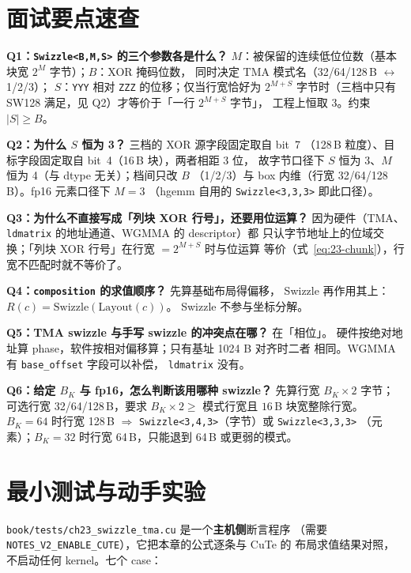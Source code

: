 \section{面试要点速查}

\textbf{Q1：\texttt{Swizzle\allowbreak{}<B,\allowbreak{}M,\allowbreak{}S>} 的三个参数各是什么？}
$M$：被保留的连续低位位数（基本块宽 $2^M$ 字节）；$B$：XOR 掩码位数，
同时决定 TMA 模式名（32/64/128\,B $\leftrightarrow$ 1/2/3）；
$S$：\texttt{YYY} 相对 \texttt{ZZZ} 的位移；仅当行宽恰好为 $2^{M+S}$
字节时（三档中只有 SW128 满足，见 Q2）才等价于「一行 $2^{M+S}$ 字节」，
工程上恒取 3。约束 $|S|\ge B$。

\textbf{Q2：为什么 $S$ 恒为 3？} 三档的 XOR 源字段固定取自 bit~7
（128\,B 粒度）、目标字段固定取自 bit~4（16\,B 块），两者相距 3 位，
故字节口径下 $S$ 恒为 3、$M$ 恒为 4（与 dtype 无关）；档间只改 $B$
（1/2/3）与 box 内维（行宽 32/64/128\,B）。fp16 元素口径下 $M=3$
（hgemm 自用的 \texttt{Swizzle\allowbreak{}<3,\allowbreak{}3,\allowbreak{}3>} 即此口径）。

\textbf{Q3：为什么不直接写成「列块 XOR 行号」，还要用位运算？}
因为硬件（TMA、\texttt{ldmatrix} 的地址通道、WGMMA 的 descriptor）都
只认字节地址上的位域交换；「列块 XOR 行号」在行宽 $=2^{M+S}$ 时与位运算
等价（式~\eqref{eq:23-chunk}），行宽不匹配时就不等价了。

\textbf{Q4：\texttt{composition} 的求值顺序？} 先算基础布局得偏移，
Swizzle 再作用其上：$R(c)=\text{Swizzle}(\text{Layout}(c))$。
Swizzle 不参与坐标分解。

\textbf{Q5：TMA swizzle 与手写 swizzle 的冲突点在哪？} 在「相位」。
硬件按绝对地址算 phase，软件按相对偏移算；只有基址 1024 B 对齐时二者
相同。WGMMA 有 \texttt{base\_offset} 字段可以补偿，
\texttt{ldmatrix} 没有。

\textbf{Q6：给定 $B_K$ 与 fp16，怎么判断该用哪种 swizzle？} 先算行宽
$B_K\times2$ 字节；可选行宽 32/64/128\,B，要求 $B_K\times2\ge$
模式行宽且 $16$\,B 块宽整除行宽。$B_K=64$ 时行宽 128\,B
$\Rightarrow$ \texttt{Swizzle\allowbreak{}<3,\allowbreak{}4,\allowbreak{}3>}（字节）或 \texttt{Swizzle\allowbreak{}<3,\allowbreak{}3,\allowbreak{}3>}
（元素）；$B_K=32$ 时行宽 64\,B，只能退到 64\,B 或更弱的模式。

\section{最小测试与动手实验}\label{sec:23-minitest}

\texttt{book/\allowbreak{}tests/\allowbreak{}ch23\_\allowbreak{}swizzle\_\allowbreak{}tma.cu} 是一个\textbf{主机侧}断言程序
（需要 \texttt{NOTES\_\allowbreak{}V2\_\allowbreak{}ENABLE\_\allowbreak{}CUTE}），它把本章的公式逐条与 CuTe 的
布局求值结果对照，不启动任何 kernel。七个 case：

